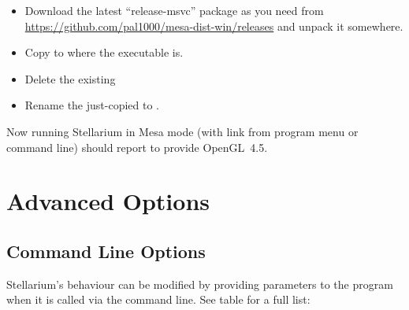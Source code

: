 \begin{itemize}
\item Download the latest ``release-msvc'' package as you need from \url{https://github.com/pal1000/mesa-dist-win/releases} and unpack it somewhere.
\item Copy  to where the executable  is.
\item Delete the existing 
\item Rename the just-copied  to .
\end{itemize}

\noindent Now running Stellarium in Mesa mode (with link from program menu or command line) should report to provide OpenGL~4.5.



\chapter{Advanced Options}

\section{Command Line Options} 
\label{sec:CommandLineOptions}

Stellarium's behaviour can be modified by providing parameters to the
program when it is called via the command line. See table for a full list:

